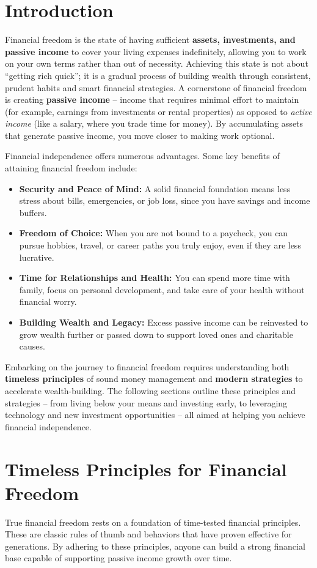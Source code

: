 \documentclass[12pt]{article}
\begin{document}
\section{Introduction}
Financial freedom is the state of having sufficient \textbf{assets, investments, and passive income} to cover your living expenses indefinitely, allowing you to work on your own terms rather than out of necessity. Achieving this state is not about ``getting rich quick''; it is a gradual process of building wealth through consistent, prudent habits and smart financial strategies. A cornerstone of financial freedom is creating \textbf{passive income} -- income that requires minimal effort to maintain (for example, earnings from investments or rental properties) as opposed to \textit{active income} (like a salary, where you trade time for money). By accumulating assets that generate passive income, you move closer to making work optional.
\par
\vspace{0.5\baselineskip}
Financial independence offers numerous advantages. Some key benefits of attaining financial freedom include:
\begin{itemize}
    \item \textbf{Security and Peace of Mind:} A solid financial foundation means less stress about bills, emergencies, or job loss, since you have savings and income buffers.
    \item \textbf{Freedom of Choice:} When you are not bound to a paycheck, you can pursue hobbies, travel, or career paths you truly enjoy, even if they are less lucrative.
    \item \textbf{Time for Relationships and Health:} You can spend more time with family, focus on personal development, and take care of your health without financial worry.
    \item \textbf{Building Wealth and Legacy:} Excess passive income can be reinvested to grow wealth further or passed down to support loved ones and charitable causes.
\end{itemize}
Embarking on the journey to financial freedom requires understanding both \textbf{timeless principles} of sound money management and \textbf{modern strategies} to accelerate wealth-building. The following sections outline these principles and strategies -- from living below your means and investing early, to leveraging technology and new investment opportunities -- all aimed at helping you achieve financial independence\cite{Kiyosaki1997}.
\section{Timeless Principles for Financial Freedom}
True financial freedom rests on a foundation of time-tested financial principles. These are classic rules of thumb and behaviors that have proven effective for generations. By adhering to these principles, anyone can build a strong financial base capable of supporting passive income growth over time.
\end{document}
